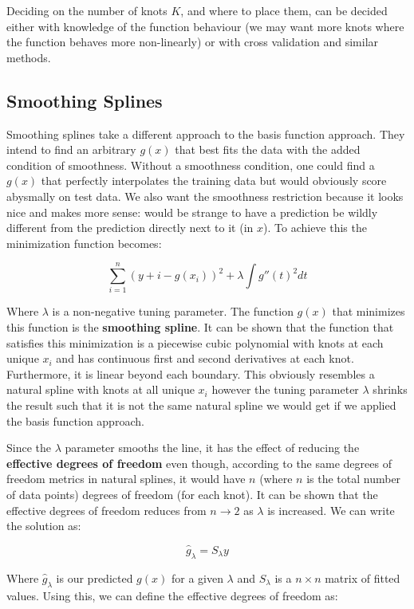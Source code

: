 Deciding on the number of knots $K$, and where to place them, can be decided either with knowledge of the function behaviour (we may want more knots where the function behaves more non-linearly) or with cross validation and similar methods.

\subsection{Smoothing Splines}

Smoothing splines take a different approach to the basis function approach. They intend to find an arbitrary $g(x)$ that best fits the data with the added condition of smoothness. Without a smoothness condition, one could find a $g(x)$ that perfectly interpolates the training data but would obviously score abysmally on test data. We also want the smoothness restriction because it looks nice and makes more sense: would be strange to have a prediction be wildly different from the prediction directly next to it (in $x$). To achieve this the minimization function becomes:

$$ \sum^{n}_{i=1}(y+{i}-g(x_{i}))^{2} + \lambda\int g''(t)^{2}dt $$

Where $\lambda$ is a non-negative tuning parameter. The function $g(x)$ that minimizes this function is the \textbf{smoothing spline}. It can be shown that the function that satisfies this minimization is a piecewise cubic polynomial with knots at each unique $x_{i}$ and has continuous first and second derivatives at each knot. Furthermore, it is linear beyond each boundary. This obviously resembles a natural spline with knots at all unique $x_{i}$ however the tuning parameter $\lambda$ shrinks the result such that it is not the same natural spline we would get if we applied the basis function approach.

Since the $\lambda$ parameter smooths the line, it has the effect of reducing the \textbf{effective degrees of freedom} even though, according to the same degrees of freedom metrics in natural splines, it would have $n$ (where $n$ is the total number of data points) degrees of freedom (for each knot). It can be shown that the effective degrees of freedom reduces from $n\to 2$ as $\lambda$ is increased. We can write the solution as:

$$ \hat{g}_{\lambda} = S_{\lambda}y $$

Where $\hat{g}_{\lambda}$ is our predicted $g(x)$ for a given $\lambda$ and $S_{\lambda}$ is a $n\times n$ matrix of fitted values. Using this, we can define the effective degrees of freedom as:

